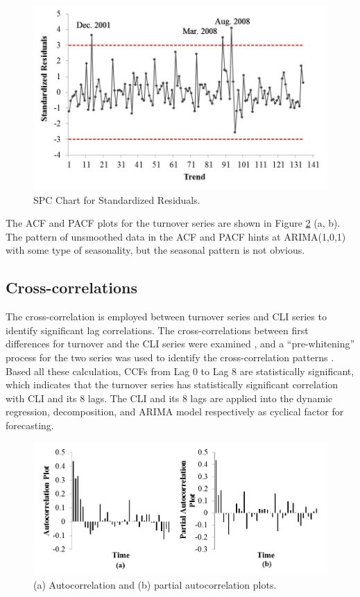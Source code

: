 \begin{figure}
	\centering
	\includegraphics[width=5.5in]{Fig2.jpg}
	\caption{SPC Chart for Standardized Residuals.}
	\label{fig:2}
\end{figure}
The ACF and PACF plots for the turnover series are shown in Figure \ref{fig:3} (a, b). The pattern of unsmoothed data in the ACF and PACF hints at ARIMA(1,0,1) with some type of seasonality, but the seasonal pattern is not obvious.
\subsection{Cross-correlations}
The cross-correlation is employed between turnover series and CLI series to identify significant lag correlations. The cross-correlations between first differences for turnover and the CLI series were examined \citep{de1998}, and a “pre-whitening” process for the two series was used to identify the cross-correlation patterns \citep{box1970, bowie1981}.
Based all these calculation, CCFs from Lag 0 to Lag 8 are statistically significant, which indicates that the turnover series has statistically significant correlation with CLI and its 8 lags. The CLI and its 8 lags are applied into the dynamic regression, decomposition, and ARIMA model respectively as cyclical factor for forecasting.  

\begin{figure}
	\centering
	\includegraphics[width=5.5in]{Fig3.jpg}
	\caption{(a) Autocorrelation and (b) partial autocorrelation plots.}
	\label{fig:3}
\end{figure}


